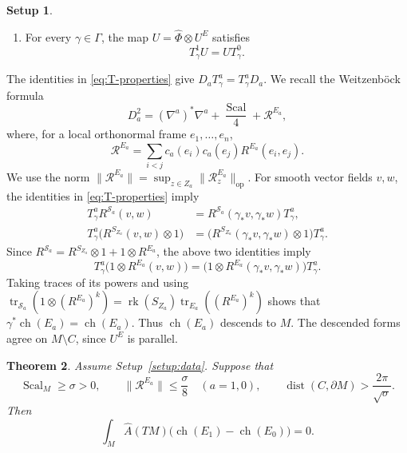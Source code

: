 \documentclass[12pt,reqno]{amsart}
\numberwithin{equation}{section}
\newtheorem{theorem}{Theorem}[section]
\theoremstyle{definition}
\newtheorem{setup}[theorem]{Setup}
\newcommand{\Sc}{\operatorname{Scal}}
\newcommand{\Ahat}{\widehat A}
\newcommand{\ch}{\operatorname{ch}}
\newcommand{\tr}{\operatorname{tr}}
\newcommand{\dist}{\operatorname{dist}}
\newcommand{\cR}{\mathcal R}
\newcommand{\cS}{\mathcal S}
\begin{document}
\begin{setup}
\begin{enumerate}[label=\textup{(S\arabic*)},ref=\textup{(S\arabic*)},
                  leftmargin=3.4em]
\item\label{setup:compatibility}
For every $\gamma\in\Gamma$, the map $U=\widehat\Phi\otimes U^E$ satisfies
\begin{equation}\label{eq:exterior-compatibility}
 T^1_\gamma U=UT^0_\gamma.
\end{equation}
\end{enumerate}
\end{setup}

The identities in \eqref{eq:T-properties} give $D_aT^a_\gamma=T^a_\gamma D_a$.
We recall the Weitzenb\"ock formula
\cite[Theorem~II.8.17]{LawsonMichelsohn} 
\begin{equation}\label{eq:SL}
 D_a^2=(\nabla^a)^*\nabla^a+\frac{\Sc}{4}+\cR^{E_a},
\end{equation}
where, for a local orthonormal frame $e_1,\ldots,e_n$,
\begin{equation}\label{eq:twisting-curvature-endomorphism}
 \cR^{E_a}=\sum_{i<j}c_a(e_i)c_a(e_j)R^{E_a}(e_i,e_j).
\end{equation}
We use the norm $\|\cR^{E_a}\|=\sup_{z\in Z_a}
\|\cR^{E_a}_z\|_{\mathrm{op}}$.
For smooth vector fields $v,w$, the identities in
\eqref{eq:T-properties} imply
\[
\begin{aligned}
 T^a_\gamma R^{\cS_a}(v,w)
 &=R^{\cS_a}(\gamma_*v,\gamma_*w)T^a_\gamma,\\
 T^a_\gamma\bigl(R^{S_{Z_a}}(v,w)\otimes1\bigr)
 &=\bigl(R^{S_{Z_a}}(\gamma_*v,\gamma_*w)\otimes1\bigr)T^a_\gamma.
\end{aligned}
\]
Since $R^{\cS_a}=R^{S_{Z_a}}\otimes1+1\otimes R^{E_a}$, the above two identities imply
\begin{equation}\label{eq:twisting-curvature-under-gamma}
 T^a_\gamma\bigl(1\otimes R^{E_a}(v,w)\bigr)
 =\bigl(1\otimes R^{E_a}(\gamma_*v,\gamma_*w)\bigr)T^a_\gamma.
\end{equation}
Taking traces of its powers and using
$\tr_{\cS_a}(1\otimes(R^{E_a})^k)
=\operatorname{rk}(S_{Z_a})\tr_{E_a}((R^{E_a})^k)$ shows that
$\gamma^*\ch(E_a)=\ch(E_a)$.  Thus $\ch(E_a)$ descends to $M$.
The descended forms agree on $M\setminus C$, since $U^E$ is parallel.

\begin{theorem}\label{thm:vanishing}
Assume Setup~\ref{setup:data}. Suppose that
\[
 \Sc_M\geq\sigma>0,\qquad
 \|\cR^{E_a}\|\leq\frac{\sigma}{8}\quad(a=1,0),\qquad
 \dist(C,\partial M)>\frac{2\pi}{\sqrt\sigma}.
\]
Then
\begin{equation}\label{eq:vanishing}
 \int_M\Ahat(TM)\bigl(\ch(E_1)-\ch(E_0)\bigr)=0.
\end{equation}
\end{theorem}
\end{document}
